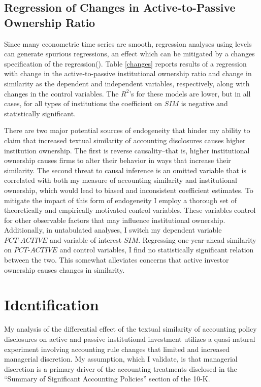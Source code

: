 \documentclass[thesis]{thesis-umich}
\begin{document}
\subsection{Regression of Changes in Active-to-Passive Ownership Ratio}  \label{ssec:changes}
Since many econometric time series are smooth, regression analyses using levels can generate spurious regressions, an effect which can be mitigated by a changes specification of the regression(\cite{grangernewbold1974}). Table \ref{changes} reports results of a regression with change in the active-to-passive institutional ownership ratio and change in similarity as the dependent and independent variables, respectively, along with changes in the control variables. The $R^2$'s for these models are lower, but in all cases, for all types of institutions the coefficient on $SIM$ is negative and statistically significant.

There are two major potential sources of endogeneity that hinder my ability to claim that increased textual similarity of accounting disclosures causes higher institution ownership. The first is reverse causality--that is, higher institutional ownership causes firms to alter their behavior in ways that increase their similarity. The second threat to causal inference is an omitted variable that is correlated with both my measure of accounting similarity and institutional ownership, which would lead to biased and inconsistent coefficient estimates. To mitigate the impact of this form of endogeneity I employ a thorough set of theoretically and empirically motivated control variables. These variables control for other observable factors that may influence institutional ownership. Additionally, in untabulated analyses, I switch my dependent variable $PCT\text{-}ACTIVE$ and variable of interest $SIM$. Regressing one-year-ahead similarity on $PCT\text{-}ACTIVE$ and control variables, I find no statistically significant relation between the two. This somewhat alleviates concerns that active investor ownership causes changes in similarity.

\section{Identification}\label{sec:identification}
My analysis of the differential effect of the textual similarity of accounting policy disclosures on active and passive institutional investment utilizes a quasi-natural experiment involving accounting rule changes that limited and increased managerial discretion. My assumption, which I validate, is that managerial discretion is a primary driver of the accounting treatments disclosed in the ``Summary of Significant Accounting Policies'' section of the 10-K.
\end{document}
